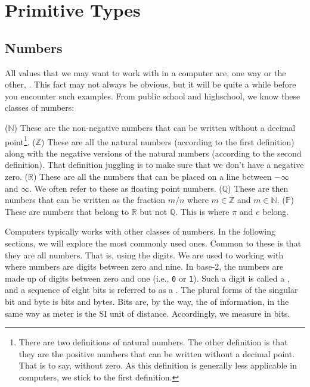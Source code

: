 \chapter{Primitive Types}

\section{Numbers}

All values that we may want to work with in a computer are, one way or the other, . This fact may not always be obvious, but it will be quite a while before you encounter such examples. From public school and highschool, we know these classes of numbers:
\begin{itemize}
   ($\mathbb{N}$) These are the non-negative numbers that can be written without a decimal point\footnote{There are two definitions of natural numbers. The other definition is that they are the positive numbers that can be written without a decimal point. That is to say, without zero. As this definition is generally less applicable in computers, we stick to the first definition.}.
   ($\mathbb{Z}$) These are all the natural numbers (according to the first definition) along with the negative versions of the natural numbers (according to the second definition). That definition juggling is to make sure that we don't have a negative zero.
   ($\mathbb{R}$) These are all the numbers that can be placed on a line between $-\infty$ and $\infty$. We often refer to these as floating point numbers.
   ($\mathbb{Q}$) These are then numbers that can be written as the fraction $m/n$ where $m \in \mathbb{Z}$ and $m \in \mathbb{N}$.
   ($\mathbb{P}$) These are numbers that belong to $\mathbb{R}$ but not $\mathbb{Q}$. This is where $\pi$ and $e$ belong.
\end{itemize}
Computers typically works with other classes of numbers. In the following sections, we will explore the most commonly used ones. Common to these is that they are all  numbers. That is, using the  digits. We are used to working with  where numbers are digits between zero and nine. In base-2, the numbers are made up of digits between zero and one (i.e., \texttt{0} or \texttt{1}). Such a digit is called a , and a sequence of eight bits is referred to as a . The plural forms of the singular bit and byte is bits and bytes. Bits are, by the way, the  of information, in the same way as meter is the SI unit of distance. Accordingly, we measure  in bits.

